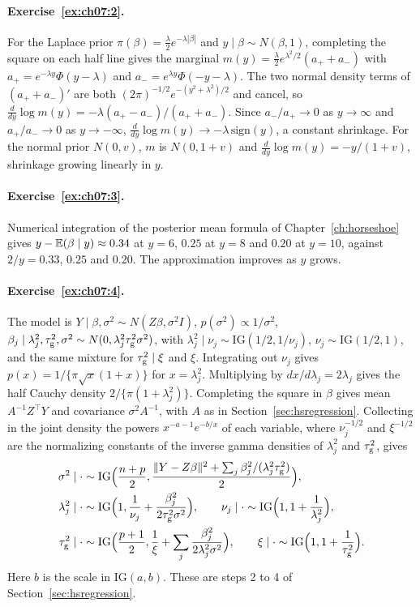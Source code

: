 \paragraph{Exercise~\ref{ex:ch07:2}.} For the Laplace prior $\pi(\beta) = \frac{\lambda}{2}e^{-\lambda|\beta|}$ and $y \mid \beta \sim N(\beta, 1)$, completing the square on each half line gives the marginal $m(y) = \frac{\lambda}{2}e^{\lambda^2/2}(a_+ + a_-)$ with $a_+ = e^{-\lambda y}\Phi(y - \lambda)$ and $a_- = e^{\lambda y}\Phi(-y - \lambda)$. The two normal density terms of $(a_+ + a_-)'$ are both $(2\pi)^{-1/2}e^{-(y^2 + \lambda^2)/2}$ and cancel, so $\frac{d}{dy}\log m(y) = -\lambda(a_+ - a_-)/(a_+ + a_-)$. Since $a_-/a_+ \to 0$ as $y \to \infty$ and $a_+/a_- \to 0$ as $y \to -\infty$, $\frac{d}{dy}\log m(y) \to -\lambda\,\mathrm{sign}(y)$, a constant shrinkage. For the normal prior $N(0, v)$, $m$ is $N(0, 1 + v)$ and $\frac{d}{dy}\log m(y) = -y/(1 + v)$, shrinkage growing linearly in $y$.

\paragraph{Exercise~\ref{ex:ch07:3}.} Numerical integration of the posterior mean formula of Chapter~\ref{ch:horseshoe} gives $y - \mathbb{E}(\beta \mid y) \approx 0.34$ at $y = 6$, $0.25$ at $y = 8$ and $0.20$ at $y = 10$, against $2/y = 0.33$, $0.25$ and $0.20$. The approximation improves as $y$ grows.

\paragraph{Exercise~\ref{ex:ch07:4}.} The model is $Y\mid\beta,\sigma^2\sim N(Z\beta,\sigma^2I)$, $p(\sigma^2)\propto1/\sigma^2$, $\beta_j\mid\lambda_j^2,\tau_{\mathrm{g}}^2,\sigma^2\sim N(0,\lambda_j^2\tau_{\mathrm{g}}^2\sigma^2)$, with $\lambda_j^2\mid\nu_j\sim\mathrm{IG}(1/2,1/\nu_j)$, $\nu_j\sim\mathrm{IG}(1/2,1)$, and the same mixture for $\tau_{\mathrm{g}}^2\mid\xi$ and $\xi$. Integrating out $\nu_j$ gives $p(x)=1/\{\pi\sqrt x(1+x)\}$ for $x=\lambda_j^2$. Multiplying by $dx/d\lambda_j=2\lambda_j$ gives the half Cauchy density $2/\{\pi(1+\lambda_j^2)\}$. Completing the square in $\beta$ gives mean $A^{-1}Z^\top Y$ and covariance $\sigma^2A^{-1}$, with $A$ as in Section~\ref{sec:hsregression}. Collecting in the joint density the powers $x^{-a-1}e^{-b/x}$ of each variable, where $\nu_j^{-1/2}$ and $\xi^{-1/2}$ are the normalizing constants of the inverse gamma densities of $\lambda_j^2$ and $\tau_{\mathrm{g}}^2$, gives
\begin{align*}
\sigma^2\mid\cdot&\sim\mathrm{IG}\Bigl(\frac{n+p}{2},\frac{\|Y-Z\beta\|^2+\sum_j\beta_j^2/(\lambda_j^2\tau_{\mathrm{g}}^2)}{2}\Bigr),\\
\lambda_j^2\mid\cdot&\sim\mathrm{IG}\Bigl(1,\frac1{\nu_j}+\frac{\beta_j^2}{2\tau_{\mathrm{g}}^2\sigma^2}\Bigr),\qquad
\nu_j\mid\cdot\sim\mathrm{IG}\Bigl(1,1+\frac1{\lambda_j^2}\Bigr),\\
\tau_{\mathrm{g}}^2\mid\cdot&\sim\mathrm{IG}\Bigl(\frac{p+1}{2},\frac1\xi+\sum_j\frac{\beta_j^2}{2\lambda_j^2\sigma^2}\Bigr),\qquad
\xi\mid\cdot\sim\mathrm{IG}\Bigl(1,1+\frac1{\tau_{\mathrm{g}}^2}\Bigr).
\end{align*}
Here $b$ is the scale in $\mathrm{IG}(a,b)$. These are steps 2 to 4 of Section~\ref{sec:hsregression}.

